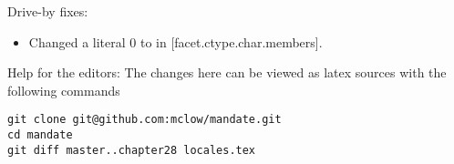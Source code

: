 Drive-by fixes:
\begin{itemize}
\item{Changed a literal 0 to  in [facet.ctype.char.members].}
\end{itemize}




\vfill
Help for the editors: The changes here can be viewed as latex sources with the following commands
\begin{verbatim}
git clone git@github.com:mclow/mandate.git
cd mandate
git diff master..chapter28 locales.tex
\end{verbatim}

